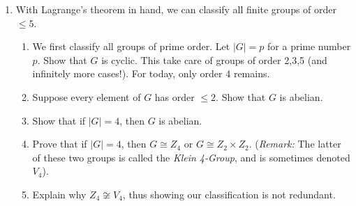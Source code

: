 \documentclass[11pt]{article}
\begin{document}
\begin{enumerate}
\begin{enumerate}
  \end{enumerate}
  \item With Lagrange's theorem in hand, we can classify all finite groups of order $\le5$.
  \begin{enumerate}
    \item We first classify all groups of prime order.  Let $|G| = p$ for a prime number $p$.  Show that $G$ is cyclic.  This take care of groups of order 2,3,5 (and infinitely more cases!).  For today, only order 4 remains.
    \item Suppose every element of $G$ has order $\le2$.  Show that $G$ is abelian.
    \item Show that if $|G|=4$, then $G$ is abelian.
    \item Prove that if $|G|=4$, then $G\cong Z_4$ or $G\cong Z_2\times Z_2$.  (\textit{Remark:} The latter of these two groups is called the \textit{Klein 4-Group}, and is sometimes denoted $V_4$).
    \item Explain why $Z_4\not\cong V_4$, thus showing our classification is not redundant.
  \end{enumerate}
\end{enumerate}
\end{document}
